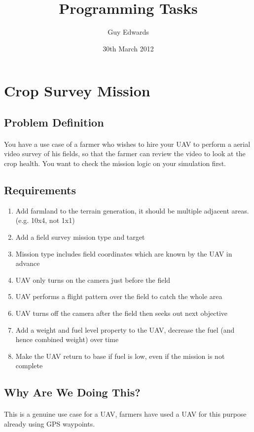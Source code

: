 \documentclass[11pt]{book}
\title{\textbf{Programming Tasks}}
\author{Guy Edwards}
\date{30th March 2012}
\begin{document}
\section{Crop Survey Mission}

\subsection{Problem Definition}

\paragraph{} You have a use case of a farmer who wishes to hire your UAV to
perform a aerial video survey of his fields, so that the farmer can review the
video to look at the crop health. You want to check the mission logic on your
simulation first.

\subsection{Requirements}

\begin{enumerate}
\item Add farmland to the terrain generation, it should be multiple adjacent areas. (e.g. 10x4, not 1x1)
\item Add a field survey mission type and target
\item Mission type includes field coordinates which are known by the UAV in advance
\item UAV only turns on the camera just before the field
\item UAV performs a flight pattern over the field to catch the whole area
\item UAV turns off the camera after the field then seeks out next objective
\item Add a weight and fuel level property to the UAV, decrease the fuel (and hence combined weight) over time
\item Make the UAV return to base if fuel is low, even if the mission is not complete
\end{enumerate}

\subsection{Why Are We Doing This?}

\paragraph{} This is a genuine use case for a UAV, farmers have used a UAV for
this purpose already using GPS waypoints.
\end{document}
